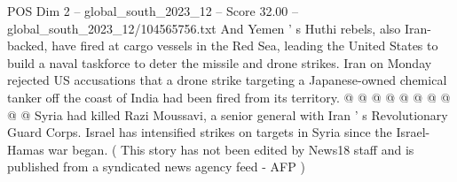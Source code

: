\begin{textsample}{POS Dim 2 – global\_south\_2023\_12 – Score 32.00 – global\_south\_2023\_12/104565756.txt}
And Yemen ' s Huthi rebels, also Iran-backed, have fired at cargo vessels in the Red Sea, leading the United States to build a naval taskforce to deter the missile and drone strikes.
Iran on Monday rejected US accusations that a drone strike targeting a Japanese-owned chemical tanker off the coast of India had been fired from its territory. @ @ @ @ @ @ @ @ @ @ Syria had killed Razi Moussavi, a senior general with Iran ' s Revolutionary Guard Corps.
Israel has intensified strikes on targets in Syria since the Israel-Hamas war began. ( This story has not been edited by News18 staff and is published from a syndicated news agency feed - AFP )

\end{textsample}
